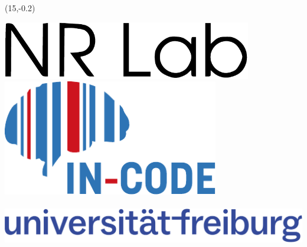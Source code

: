 \documentclass[a0]{a0poster}
\begin{document}
\begin{textblock}{5}(15,-0.2)
    \begin{flushleft}
        \includegraphics[height=1in]{media/nrlogo.pdf}
        \hspace*{1in}
        \includegraphics[height=2in]{media/incode_logo.pdf}\\[1in]
        \includegraphics[height=1in]{media/ufr_logo.pdf}
    \end{flushleft}
\end{textblock}
\end{document}
